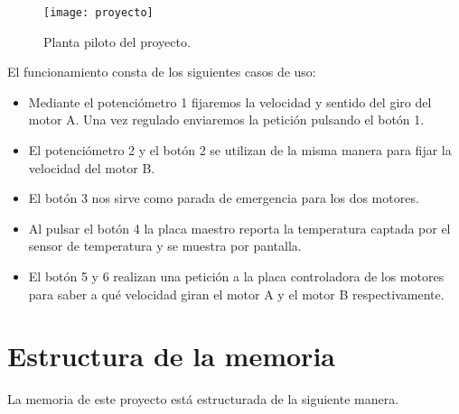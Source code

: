 \begin{figure}[!h]
	\centering
	\texttt{[image: proyecto]}
	\caption{Planta piloto del proyecto.}\label{PlantaPiloto}
\end{figure}

El funcionamiento consta de los siguientes casos de uso:
\begin{itemize}
\item Mediante el potenciómetro 1 fijaremos la velocidad y sentido del giro del motor A. Una vez regulado enviaremos la petición pulsando el botón 1.
\item El potenciómetro 2 y el botón 2 se utilizan de la misma manera para fijar la velocidad del motor B.
\item El botón 3 nos sirve como parada de emergencia para los dos motores.
\item Al pulsar el botón 4 la placa maestro reporta la temperatura captada por el sensor de temperatura y se muestra por pantalla.
\item El botón 5 y 6 realizan una petición a la placa controladora de los motores para saber a qué velocidad giran el motor A y el motor B respectivamente.
\end{itemize}

\section{Estructura de la memoria}\label{sec:Estructura}

La memoria de este proyecto está estructurada de la siguiente manera.

